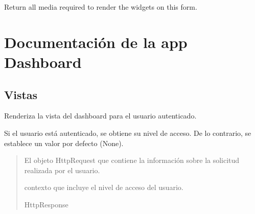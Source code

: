 \documentclass[letterpaper,10pt,spanish]{sphinxmanual}
\begin{document}
\begin{fulllineitems}
\begin{fulllineitems}

\pysigstartsignatures
{}
\pysigstopsignatures
\sphinxAtStartPar
Return all media required to render the widgets on this form.

\end{fulllineitems}


\end{fulllineitems}


\sphinxstepscope


\chapter{Documentación de la app Dashboard}
\label{\detokenize{dashboard:documentacion-de-la-app-dashboard}}\label{\detokenize{dashboard::doc}}

\section{Vistas}
\label{\detokenize{dashboard:vistas}}

\begin{fulllineitems}

\pysigstartsignatures
{}
\pysigstopsignatures
\sphinxAtStartPar
Renderiza la vista del dashboard para el usuario autenticado.

\sphinxAtStartPar
Si el usuario está autenticado, se obtiene su nivel de acceso.
De lo contrario, se establece un valor por defecto (None).
\begin{quote}\begin{description}
\sphinxAtStartPar
{} \textendash{} El objeto HttpRequest que contiene la información sobre la
solicitud realizada por el usuario.

\sphinxAtStartPar
\begin{description}
\sphinxAtStartPar
contexto que incluye el nivel de acceso del usuario.

\end{description}


\sphinxAtStartPar
HttpResponse

\end{description}\end{quote}

\end{fulllineitems}
\end{document}
